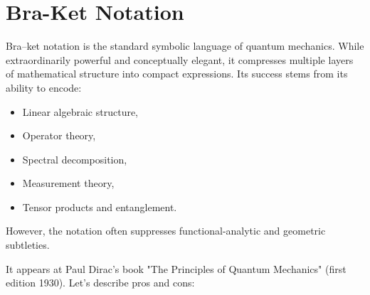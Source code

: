\section{Bra-Ket Notation}
\label{cq:bk}

Bra--ket notation is the standard symbolic language of quantum
mechanics. While extraordinarily powerful and conceptually elegant,
it compresses multiple layers of mathematical structure into compact
expressions. 
Its success stems from its ability to encode:
\begin{itemize}
\item Linear algebraic structure,
\item Operator theory,
\item Spectral decomposition,
\item Measurement theory,
\item Tensor products and entanglement.
\end{itemize}
However, the notation often suppresses functional-analytic and
geometric subtleties. 

It appears at Paul Dirac's book \cite{dirac-pqm}  "The Principles of Quantum Mechanics"
(first edition 1930). Let's describe pros and cons:
